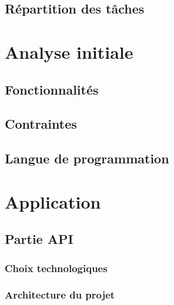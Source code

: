\section{Répartition des tâches}

\chapter{Analyse initiale}

\section {Fonctionnalités}

\section {Contraintes}

\section{Langue de programmation}

\chapter{Application}
\section{Partie API}
\subsection{Choix technologiques}
\subsection{Architecture du projet}
